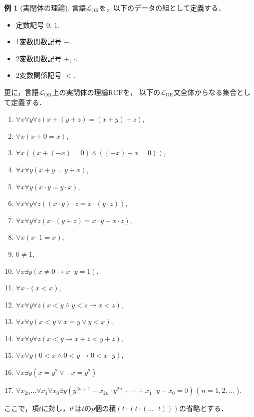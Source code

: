 \documentclass[uplatex, dvipdfmx]{jsarticle}
\numberwithin{equation}{section}
\newcommand{\RCF}{\mathrm{RCF}}
\theoremstyle{definition}
\newtheorem{example}[definition]{例}
\begin{document}
\begin{example}[実閉体の理論]
     言語$\mathcal{L}_\mathrm{OR}$を，以下のデータの組として定義する．
     \begin{itemize}
          \item 定数記号 $0$, $1$.
          \item 1変数関数記号 $-$.
          \item 2変数関数記号 $+$, $\cdot$.
          \item 2変数関係記号 $<$.
     \end{itemize}
     更に，言語$\mathcal{L}_\mathrm{OR}$上の実閉体の理論$\RCF$を，
     以下の$\mathcal{L}_\mathrm{OR}$文全体からなる集合として定義する．
          \begin{enumerate}
               \item $\forall x \forall y \forall z(x + (y + z) = (x + y) + z)$,
               \item $\forall x (x + 0 = x)$,
               \item $\forall x ((x + (-x) = 0)\land((-x) + x = 0))$,
               \item $\forall x \forall y (x + y = y + x)$,
               \item $\forall x \forall y (x \cdot y = y \cdot x)$,
               \item $\forall x \forall y \forall z((x \cdot y) \cdot z = x \cdot (y \cdot z))$,
               \item $\forall x \forall y \forall z(x \cdot (y + z) = x \cdot y + x \cdot z)$,
               \item $\forall x (x \cdot 1 = x)$,
               \item $0 \neq 1$,
               \item $\forall x \exists y (x \neq 0 \rightarrow x \cdot y = 1)$,
               \item $\forall x \lnot (x < x)$,
               \item $\forall x \forall y \forall z(x < y \land y < z \rightarrow x < z)$,
               \item $\forall x \forall y (x < y \lor x = y \lor y < x)$,
               \item $\forall x \forall y \forall z(x < y \rightarrow x + z < y + z)$,
               \item $\forall x \forall y (0 < x \land 0 < y \rightarrow 0 < x \cdot y)$,
               \item $\forall x \exists y (x = y^2 \lor -x = y^2)$
               \item $\forall x_{2n} \dots \forall x_1 \forall x_0 \exists y (y^{2n+1} + x_{2n} \cdot y^{2n} + \cdots + x_1 \cdot y + x_0 = 0)$ ( $n =  1, 2 , \dots$ ).
          \end{enumerate}

     ここで，項$t$に対し，$t^p$は$t$の$p$個の積$(t\cdot(t\cdot(\dots \cdot t)))$の省略とする．
\end{example}
\end{document}
